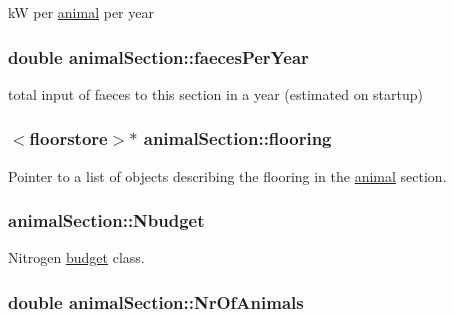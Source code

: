 kW per \hyperlink{classanimal}{animal} per year \hypertarget{classanimal_section_ab764a9e7261c89469543c202df1aff2a}{
\subsubsection[{faecesPerYear}]{\setlength{\rightskip}{0pt plus 5cm}double {\bf animalSection::faecesPerYear}}}
\label{classanimal_section_ab764a9e7261c89469543c202df1aff2a}


total input of faeces to this section in a year (estimated on startup) \hypertarget{classanimal_section_aa0266aef51887e64de19e50263deb01f}{
\subsubsection[{flooring}]{$<${\bf floorstore}$>$$\ast$ {\bf animalSection::flooring}}}
\label{classanimal_section_aa0266aef51887e64de19e50263deb01f}


Pointer to a list of objects describing the flooring in the \hyperlink{classanimal}{animal} section. \hypertarget{classanimal_section_a9da1ddf7bdd6360f4595a020aa2ab5e7}{
\subsubsection[{Nbudget}]{ {\bf animalSection::Nbudget}}}
\label{classanimal_section_a9da1ddf7bdd6360f4595a020aa2ab5e7}


Nitrogen \hyperlink{classbudget}{budget} class. \hypertarget{classanimal_section_a1911235adfd2f409e78b671cf8df0c8a}{
\subsubsection[{NrOfAnimals}]{\setlength{\rightskip}{0pt plus 5cm}double {\bf animalSection::NrOfAnimals}}}
\label{classanimal_section_a1911235adfd2f409e78b671cf8df0c8a}


